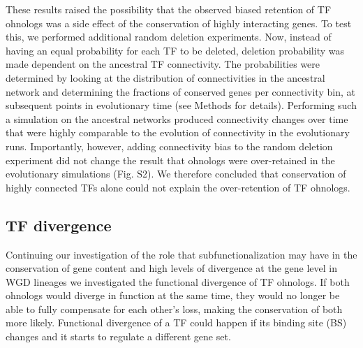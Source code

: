 These results raised the possibility that the observed biased retention of TF ohnologs was a side effect of the conservation of highly interacting genes. To test this, we performed additional random deletion experiments. Now, instead of having an equal probability for each TF to be deleted, deletion probability was made dependent on the ancestral TF connectivity. The probabilities were determined by looking at the distribution of connectivities in the ancestral network and determining the fractions of conserved genes per connectivity bin, at subsequent points in evolutionary time (see Methods for details). Performing such a simulation on the ancestral networks produced connectivity changes over time that were highly comparable to the evolution of connectivity in the evolutionary runs. Importantly, however, adding connectivity bias to the random deletion experiment did not change the result that ohnologs were over-retained in the evolutionary simulations (Fig. S2). We therefore concluded that conservation of highly connected TFs alone could not explain the over-retention of TF ohnologs.

\subsection{TF divergence}
Continuing our investigation of the role that subfunctionalization may have in the conservation of gene content and high levels of divergence at the gene level in WGD lineages we investigated the functional divergence of TF ohnologs. If both ohnologs would diverge in function at the same time, they would no longer be able to fully compensate for each other's loss, making the conservation of both more likely. Functional divergence of a TF could happen if its binding site (BS) changes and it starts to regulate a different gene set.


